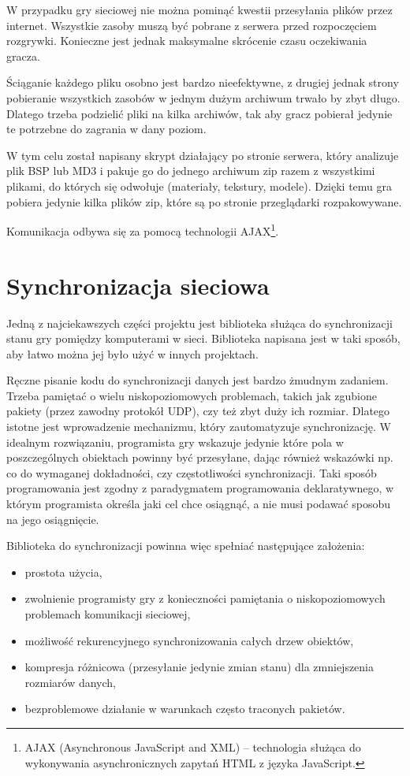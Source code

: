 W przypadku gry sieciowej nie można pominąć kwestii przesyłania plików przez internet. Wszystkie
zasoby muszą być pobrane z serwera przed rozpoczęciem rozgrywki. Konieczne jest jednak maksymalne
skrócenie czasu oczekiwania gracza.

Ściąganie każdego pliku osobno jest bardzo nieefektywne, z drugiej jednak strony pobieranie wszystkich
zasobów w jednym dużym archiwum trwało by zbyt długo. Dlatego trzeba podzielić pliki na kilka
archiwów, tak aby gracz pobierał jedynie te potrzebne do zagrania w dany poziom.

W tym celu został napisany skrypt działający po stronie serwera, który analizuje plik BSP lub MD3 i pakuje
go do jednego archiwum zip razem z wszystkimi plikami, do których się odwołuje (materiały, tekstury,
modele). Dzięki temu gra pobiera jedynie kilka plików zip, które są po stronie przeglądarki rozpakowywane.

Komunikacja odbywa się za pomocą technologii AJAX\footnote{AJAX (Asynchronous JavaScript and XML) -- technologia
służąca do wykonywania asynchronicznych zapytań HTML z języka JavaScript.}.

\section{Synchronizacja sieciowa}
\label{sec:synchronizacjaSieciowa}

Jedną z najciekawszych części projektu jest biblioteka służąca do synchronizacji stanu gry pomiędzy
komputerami w sieci. Biblioteka napisana jest w taki sposób, aby łatwo można jej było użyć w innych
projektach.

Ręczne pisanie kodu do synchronizacji danych jest bardzo żmudnym zadaniem. Trzeba pamiętać o wielu
niskopoziomowych problemach, takich jak zgubione pakiety (przez zawodny protokół UDP), czy
też zbyt duży ich rozmiar. Dlatego istotne jest wprowadzenie mechanizmu, który zautomatyzuje synchronizację.
W idealnym rozwiązaniu, programista gry wskazuje jedynie które pola w poszczególnych obiektach
powinny być przesyłane, dając również wskazówki np. co do wymaganej dokładności, czy częstotliwości
synchronizacji. Taki sposób programowania jest zgodny z paradygmatem programowania deklaratywnego,
w którym programista określa jaki cel chce osiągnąć, a nie musi podawać sposobu na jego osiągnięcie.

Biblioteka do synchronizacji powinna więc spełniać następujące założenia:
\begin{itemize}
\item prostota użycia,
\item zwolnienie programisty gry z konieczności pamiętania o niskopoziomowych problemach komunikacji
  sieciowej,
\item możliwość rekurencyjnego synchronizowania całych drzew obiektów,
\item kompresja różnicowa (przesyłanie jedynie zmian stanu) dla zmniejszenia rozmiarów danych,
\item bezproblemowe działanie w warunkach często traconych pakietów.
\end{itemize}

